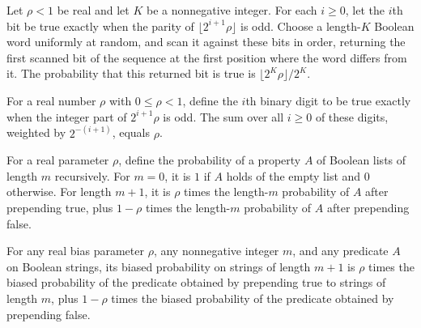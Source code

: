\begin{theorem}
\label{Randomized.randProb_rhoCoinRun_binDigit}
\leanok
{}
Let $\rho<1$ be real and let $K$ be a nonnegative integer. For each $i\ge 0$, let the
$i$th bit be true exactly when the parity of $\lfloor 2^{i+1}\rho\rfloor$ is odd. Choose
a length-$K$ Boolean word uniformly at random, and scan it against these bits in order,
returning the first scanned bit of the sequence at the first position where the word
differs from it. The probability that this returned bit is true is $\lfloor
2^K\rho\rfloor/2^K$.
\end{theorem}

\begin{theorem}
\label{Randomized.binVal_binDigit}
\leanok
{}
For a real number $\rho$ with $0\le\rho<1$, define the $i$th binary digit to be true
exactly when the integer part of $2^{i+1}\rho$ is odd. The sum over all $i\ge0$ of these
digits, weighted by $2^{-(i+1)}$, equals $\rho$.
\end{theorem}

\begin{definition}
\label{Randomized.biasedProb}
\leanok
For a real parameter $\rho$, define the probability of a property $A$ of Boolean lists
of length $m$ recursively. For $m=0$, it is $1$ if $A$ holds of the empty list and $0$
otherwise. For length $m+1$, it is $\rho$ times the length-$m$ probability of $A$ after
prepending true, plus $1-\rho$ times the length-$m$ probability of $A$ after prepending
false.
\end{definition}

\begin{theorem}
\label{Randomized.biasedProb_succ}
\leanok
{}
For any real bias parameter $\rho$, any nonnegative integer $m$, and any predicate $A$
on Boolean strings, its biased probability on strings of length $m+1$ is $\rho$ times
the biased probability of the predicate obtained by prepending true to strings of length
$m$, plus $1-\rho$ times the biased probability of the predicate obtained by prepending
false.
\end{theorem}

